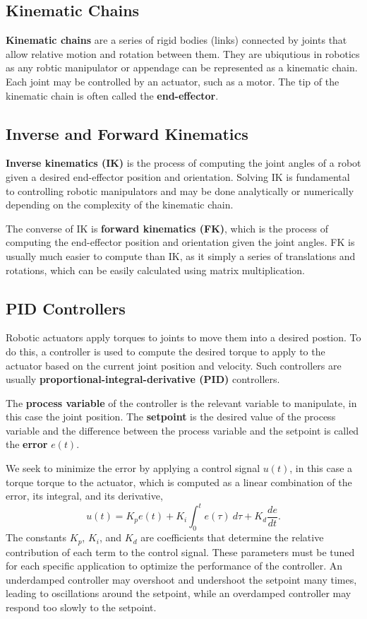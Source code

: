 \documentclass[12pt]{report}
\theoremstyle{definition}
\theoremstyle{remark}
\begin{document}
\subsection{Kinematic Chains}
\textbf{Kinematic chains} are a series of rigid bodies (links) connected by joints that allow relative motion and rotation between them. They are ubiqutious in robotics as any robtic manipulator or appendage can be represented as a kinematic chain. Each joint may be controlled by an actuator, such as a motor. The tip of the kinematic chain is often called the \textbf{end-effector}.

\subsection{Inverse and Forward Kinematics}
\textbf{Inverse kinematics (IK)} is the process of computing the joint angles of a robot given a desired end-effector position and orientation. Solving IK is fundamental to controlling robotic manipulators and may be done analytically or numerically depending on the complexity of the kinematic chain.

The converse of IK is \textbf{forward kinematics (FK)}, which is the process of computing the end-effector position and orientation given the joint angles. FK is usually much easier to compute than IK, as it simply a series of translations and rotations, which can be easily calculated using matrix multiplication.

\subsection{PID Controllers}
Robotic actuators apply torques to joints to move them into a desired postion. To do this, a controller is used to compute the desired torque to apply to the actuator based on the current joint position and velocity. Such controllers are usually \textbf{proportional-integral-derivative (PID)} controllers.

The \textbf{process variable} of the controller is the relevant variable to manipulate, in this case the joint position. The \textbf{setpoint} is the desired value of the process variable and the difference between the process variable and the setpoint is called the \textbf{error} $e(t)$.

We seek to minimize the error by applying a control signal $u(t)$, in this case a torque torque to the actuator, which is computed as a linear combination of the error, its integral, and its derivative,
\begin{equation}
    u(t) = K_p e(t) + K_i \int_0^t e(\tau)\ d\tau + K_d \frac{de}{dt}.
\end{equation}
The constants $K_p$, $K_i$, and $K_d$ are coefficients that determine the relative contribution of each term to the control signal. These parameters must be tuned for each specific application to optimize the performance of the controller. An underdamped controller may overshoot and undershoot the setpoint many times, leading to oscillations around the setpoint, while an overdamped controller may respond too slowly to the setpoint.
\end{document}
